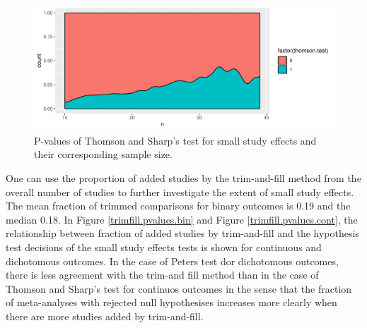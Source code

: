 \documentclass[11pt,a4paper,twoside]{book}\usepackage[]{graphicx}\usepackage[]{color}
\newenvironment{knitrout}{}{} %
\begin{document}
\begin{figure}
\begin{knitrout}
\color{fgcolor}

{\centering \includegraphics[width=\textwidth-3cm]{figure/ch02_figunnamed-chunk-27-1} 

}



\end{knitrout}
\caption{P-values of Thomson and Sharp's test for small study effects and their corresponding sample size.}
\label{pvalues.samplesize}
\end{figure}



\vspace{0mm}
One can use the proportion of added studies by the trim-and-fill method from the overall number of studies to further investigate the extent of small study effects. The mean fraction of trimmed comparisons for binary outcomes is 0.19 and the median 0.18. 
In Figure \ref{trimfill.pvalues.bin} and Figure \ref{trimfill.pvalues.cont}, the relationship between fraction of added studies by trim-and-fill and the hypothesis test decisions of the small study effects tests is shown for continuous and dichotomous outcomes. In the case of Peters test dor dichotomous outcomes, there is less agreement with the trim-and fill method than in the case of Thomson and Sharp's test for continuos outcomes in the sense that the fraction of meta-analyses with rejected null hypothesises increases more clearly when there are more studies added by trim-and-fill. 
\end{document}
